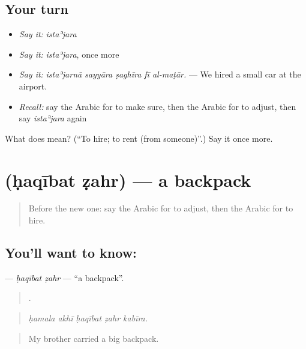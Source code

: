 \subsection*{Your turn}
\begin{itemize}
\raggedright
  \item \emph{Say it:} \emph{istaʾjara}
  \item \emph{Say it:} \emph{istaʾjara}, once more
  \item \emph{Say it:} \emph{istaʾjarnā sayyāra ṣaghīra fī al-maṭār.} — We hired a small car at the airport.
  \item \emph{Recall:} say the Arabic for to make sure, then the Arabic for to adjust, then say \emph{istaʾjara} again
\end{itemize}

\begin{tcolorbox}[breakable,colback=teal!4,colframe=teal!35!black,title={Before you move on}]
What does  mean? (\textquotedblleft{}To hire; to rent (from someone)\textquotedblright{}.) Say it once more.
\end{tcolorbox}
\section[\texorpdfstring{\ar{حقيبة} \ar{ظهر} (ḥaqībat ẓahr)}{حقيبة ظهر (ḥaqībat ẓahr)}]{  (ḥaqībat ẓahr) — a backpack}

\label{lesson:AR-C427-haqibat-zahr}



\begin{quote}
Before the new one: say the Arabic for to adjust, then the Arabic for to hire.
\end{quote}

\subsection*{You'll want to know:  }
\textbf{ } — \emph{ḥaqībat ẓahr} — \textquotedblleft{}a backpack\textquotedblright{}.

\begin{quote}
    .
\end{quote}

\begin{quote}
\emph{ḥamala akhī ḥaqībat ẓahr kabīra.}
\end{quote}

\begin{quote}
My brother carried a big backpack.
\end{quote}

